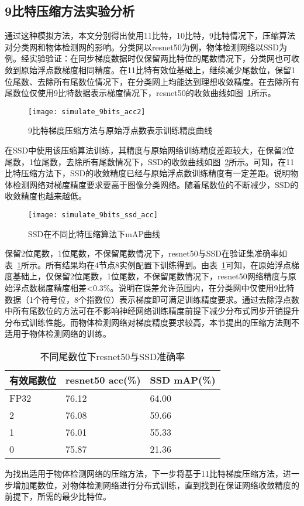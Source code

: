 \subsection{9比特压缩方法实验分析}
通过这种模拟方法，本文分别得出使用11比特，10比特，9比特情况下，压缩算法对分类网和物体检测网的影响。分类网以resnet50为例，物体检测网络以SSD为例。经实验验证：在同步梯度数据时仅保留两比特位的尾数情况下，分类网也可收敛到原始浮点数梯度相同精度。在11比特有效位基础上，继续减少尾数位，保留1位尾数、去除所有尾数位情况下，在分类网上均能达到理想收敛精度。在去除所有尾数位仅使用9比特数据表示梯度情况下，resnet50的收敛曲线如图~\ref{fig:simulate_9bits_acc}所示。

\begin{figure}[htp]
\centering
\texttt{[image: simulate\_9bits\_acc2]}
\caption{9比特梯度压缩方法与原始浮点数表示训练精度曲线}
\label{fig:simulate_9bits_acc}
\end{figure}

在SSD中使用该压缩算法训练，其精度与原始网络训练精度差距较大，在保留2位尾数，1位尾数，去除所有尾数情况下，SSD的收敛曲线如图~\ref{fig:simulate_9bits_ssd_acc}所示。可知，在11比特压缩方法下，SSD的收敛精度已经与原始浮点数训练精度有一定差距。说明物体检测网络对梯度精度要求要高于图像分类网络。随着尾数位的不断减少，SSD的收敛精度也越来越低。
\begin{figure}[htp]
\centering
\texttt{[image: simulate\_9bits\_ssd\_acc]}
\caption{SSD在不同比特压缩算法下mAP曲线}
\label{fig:simulate_9bits_ssd_acc}
\end{figure}

保留2位尾数，1位尾数，不保留尾数情况下，resnet50与SSD在验证集准确率如表~\ref{tab:simulate_11_10_9bits_acc}所示。所有结果均在4节点8实例配置下训练得到。由表~\ref{tab:simulate_11_10_9bits_acc}可知，在原始浮点梯度基础上，仅保留2位尾数，1位尾数，不保留尾数情况下，resnet50网络精度与原始浮点数梯度精度相差<0.3\%。说明在误差允许范围内，在分类网中仅使用9比特数据（1个符号位，8个指数位）表示梯度即可满足训练精度要求。通过去除浮点数中所有尾数位的方法可在不影响神经网络训练精度前提下减少分布式同步开销提升分布式训练性能。而物体检测网络对梯度精度要求较高，本节提出的压缩方法则不适用于物体检测网络的训练。

\begin{table}[htb]
\centering
\noindent\begin{minipage}{0.6\textwidth}
\centering
\caption{不同尾数位下resnet50与SSD准确率}
\label{tab:simulate_11_10_9bits_acc}
\begin{tabular}{p{2cm}p{2.5cm}p{2.5cm}}
\toprule[1.5pt]
有效尾数位 & resnet50 acc(\%) & SSD mAP(\%) \\\midrule[1pt]
FP32 & 76.12 & 64.00 \\
2 & 76.08 & 59.66 \\
1 & 76.01 & 55.33 \\
0 & 75.87 & 21.36 \\
\midrule[1pt]
\end{tabular}
\end{minipage}
\end{table}
为找出适用于物体检测网络的压缩方法，下一步将基于11比特梯度压缩方法，进一步增加尾数位，对物体检测网络进行分布式训练，直到找到在保证网络收敛精度的前提下，所需的最少比特位。

